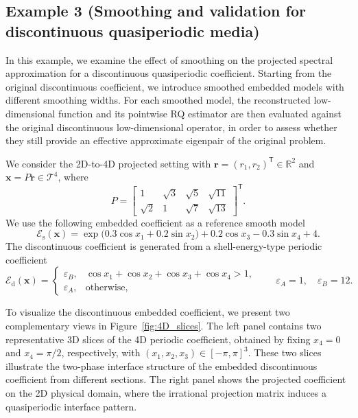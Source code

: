 \documentclass[11pt]{article}
\numberwithin{equation}{section}
\begin{document}
\subsection*{Example 3 (Smoothing and validation for discontinuous quasiperiodic media)}
\label{subsec:regularity_smoothing}

In this example, we examine the effect of smoothing on the projected spectral approximation for a discontinuous quasiperiodic coefficient. Starting from the original discontinuous coefficient, we introduce smoothed embedded models with different smoothing widths. For each smoothed model, the reconstructed low-dimensional function and its pointwise RQ estimator are then evaluated against the original discontinuous low-dimensional operator, in order to assess whether they still provide an effective approximate eigenpair of the original problem.


We consider the 2D-to-4D projected setting with $\mathbf r=(r_1,r_2)^\mathsf T\in\mathbb R^2$ and $\mathbf x=P\mathbf r\in\mathcal T^4$, where
\begin{equation}
P=
\begin{bmatrix}
1 & \sqrt3 & \sqrt5 & \sqrt{11}\\
\sqrt2 & 1 & \sqrt7 & \sqrt{13}
\end{bmatrix}^{\mathsf T}.
\label{eq:regularity_projection_matrix}
\end{equation}
We use the following embedded coefficient as a reference smooth model
\begin{equation}
\mathcal E_{\mathrm s}(\mathbf x)
=
\exp \bigl(
0.3\cos x_1 + 0.2\sin x_2
\bigr)
+ 0.2\cos x_3 - 0.3\sin x_4 + 4.
\label{eq:smooth_regularity_coefficient}
\end{equation}
The discontinuous coefficient is generated from a shell-energy-type periodic coefficient
\begin{equation}
\mathcal E_{\mathrm d}(\mathbf x) =
\begin{cases}
\varepsilon_B,
&
\cos x_1+\cos x_2+\cos x_3+\cos x_4 > 1, \\
\varepsilon_A,
&
\text{otherwise},
\end{cases} \qquad
\varepsilon_A=1, \quad \varepsilon_B=12.
\label{eq:discontinuous_regularity_coefficient}
\end{equation}

To visualize the discontinuous embedded coefficient, we present two complementary views in Figure~\ref{fig:4D_slices}. The left panel contains two representative 3D slices of the 4D periodic coefficient, obtained by fixing $x_4=0$ and $x_4=\pi/2$, respectively, with $(x_1,x_2,x_3)\in[-\pi,\pi]^3$. These two slices illustrate the two-phase interface structure of the embedded discontinuous coefficient from different sections. The right panel shows the projected coefficient on the 2D physical domain, where the irrational projection matrix induces a quasiperiodic interface pattern.
\end{document}
